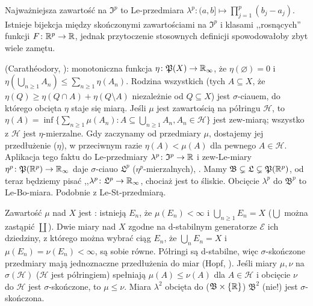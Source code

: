 Najważniejsza  zawartość na $\mathfrak I^p$ to Le-przedmiara $\lambda^p \colon (a,b] \mapsto \prod_{j=1}^p (b_j - a_j)$.
Istnieje bijekcja między skończonymi zawartościami na $\mathfrak I^p$ i klasami ,,rosnących'' funkcji $F \colon \mathbb{R}^p \to \mathbb{R}$, jednak przytoczenie stosownych definicji spowodowałoby zbyt wiele zamętu.

  (Carathéodory, ): monotoniczna funkcja $\eta \colon \mathfrak P(X) \to \mathbb{R}_\infty$, że $\eta(\varnothing) = 0$ i $\eta(\bigcup_{n \ge 1} A_n) \le \sum_{n \ge 1} \eta(A_n)$.
Rodzina wszystkich  (tych $A \subseteq X$, że $\eta (Q) \ge \eta(Q \cap A) + \eta(Q \setminus A)$ niezależnie od $Q \subseteq X$) jest $\sigma$-ciauem, do którego obcięta $\eta$ staje się miarą.
Jeśli $\mu$ jest zawartością na półringu $\mathcal H$, to $\eta(A) = \inf \{\sum_{n \ge 1} \mu(A_n) : A \subseteq \bigcup_{n \ge 1} A_n, A_n \in \mathcal H\}$ jest zew-miarą; wszystko z $\mathcal H$ jest $\eta$-mierzalne.
Gdy zaczynamy od przedmiary $\mu$, dostajemy jej przedłużenie ($\eta$), w przeciwnym razie $\eta(A) < \mu(A)$ dla pewnego $A \in \mathcal H$.
Aplikacja tego faktu do Le-przedmiary $\lambda^p \colon \mathfrak I^p \to \mathbb{R}$ i zew-Le-miary $\eta^p \colon \mathfrak P(\mathbb{R}^p) \to \mathbb{R}_\infty$ daje $\sigma$-ciauo $\mathfrak L^p$ ($\eta^p$-mierzalnych), .
Mamy $\mathfrak B \subsetneq \mathfrak L \subsetneq \mathfrak P(\mathbb{R}^p)$, od teraz będziemy pisać ,,$\lambda^p \colon \mathfrak L^p \to \mathbb{R}_\infty$, chociaż jest to śliskie.
Obcięcie $\lambda^p$ do $\mathfrak B^p$ to Le-Bo-miara.
Podobnie z Le-St-przedmiarą.

Zawartość  $\mu$ nad $X$ jest : istnieją $E_n$, że $\mu(E_n) < \infty$ i $\bigcup_{n \ge 1} E_n = X$ ($\bigcup$ można zastąpić $\coprod$).
Dwie miary nad $X$ zgodne na d-stabilnym generatorze $\mathcal E$ ich dziedziny, z którego można wybrać ciąg $E_n$, że $\bigcup_n E_n = X$ i $\mu(E_n) = \nu(E_n) < \infty$, są sobie równe.
Półringi są d-stabilne, więc $\sigma$-skończone przedmiary mają jednoznaczne przedłużenia do miar (Hopf, ).
Jeśli miary $\mu, \nu$ na $\sigma(\mathcal H)$ ($\mathcal H$ jest półringiem) spełniają $\mu(A) \le \nu(A)$ dla $A \in \mathcal H$ i obcięcie $\nu$ do $\mathcal H$ jest $\sigma$-skończone, to $\mu \le \nu$.
Miara $\lambda^2$ obcięta do ($\mathfrak B \times \{\mathbb{R}\}$) $\mathfrak B^2$ (nie!) jest $\sigma$-skończona.

